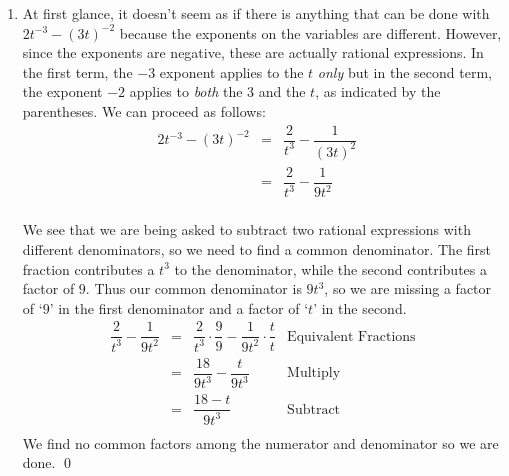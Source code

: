 \documentclass[10pt]{article}
\begin{document}
\begin{ex}
\begin{enumerate}
\item  At first glance, it doesn't seem as if there is anything that can be done with $2t^{-3} - (3t)^{-2}$ because the exponents on the variables are different.  However, since the exponents are negative, these are actually rational expressions.  In the first term, the $-3$ exponent applies to the $t$ \textit{only} but in the second term, the exponent $-2$ applies to \textit{both} the $3$ and the $t$, as indicated by the parentheses.  We can proceed as follows:\[ \begin{array}{rclr}

 2t^{-3} - (3t)^{-2} & = & \dfrac{2}{t^3} - \dfrac{1}{(3t)^2} & \\ [10pt]
                     & = & \dfrac{2}{t^3} - \dfrac{1}{9t^2} & \\ \end{array}\]
										
We see that we are being asked to subtract two rational expressions with different denominators, so we need to find a common denominator.  The first fraction contributes a $t^3$ to the denominator, while the second contributes a factor of $9$.  Thus our common denominator is $9t^3$, so we are missing a factor of `$9$' in the first denominator and a factor of `$t$' in the second. \[ \begin{array}{rclr}

 \dfrac{2}{t^3} - \dfrac{1}{9t^2} & = &  \dfrac{2}{t^3} \cdot \dfrac{9}{9} - \dfrac{1}{9t^2} \cdot \dfrac{t}{t} & \text{Equivalent Fractions} \\ [10pt]

                                  & = &  \dfrac{18}{9t^3} - \dfrac{t}{9t^3} & \text{Multiply}\\ [10pt]
																	
																	& = & \dfrac{18 - t}{9t^3} & \text{Subtract} \\ \end{array}\]
We find no common factors among the numerator and denominator so we are done.  \qed


\end{enumerate}
\end{ex}
\end{document}
